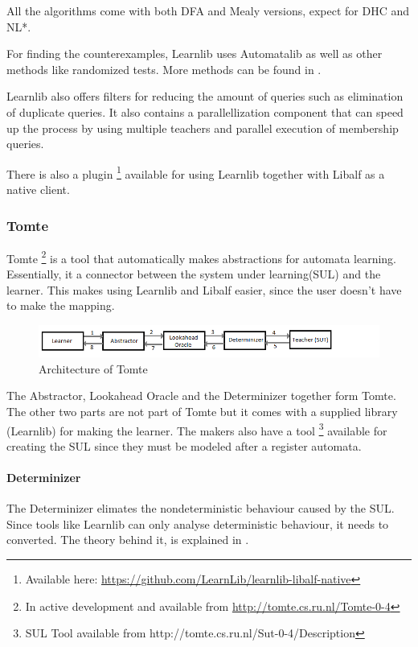 \documentclass[multi,crop=false,class=article]{standalone}
\begin{document}
All the algorithms come with both DFA and Mealy versions, expect for DHC and NL*.

For finding the counterexamples, Learnlib uses Automatalib as well as other 
methods like randomized tests. More methods can be found in \cite{Isberner2015}.

Learnlib also offers filters for reducing the amount of queries such as 
elimination of duplicate queries. %
It also contains a parallellization component that can speed up the process by 
using multiple teachers and parallel execution of membership 
queries\cite{Henrix15}\cite{Howar2012}. 

There is also a plugin \footnote{Available here: 
\url{https://github.com/LearnLib/learnlib-libalf-native}} available for using 
Learnlib together with Libalf as a 
native client.

\subsubsection{Tomte}
\label{sssec:tomte}
Tomte \footnote{In active development and available from 
\url{http://tomte.cs.ru.nl/Tomte-0-4}} is a tool that automatically makes 
abstractions for automata learning. Essentially, it a connector between the 
system under learning(SUL) and the learner. This makes using Learnlib and 
Libalf easier, since the user doesn't have to make the mapping.

\begin{figure}[!ht]
	\includegraphics[width=\textwidth]{Tool_images/tomte_network.png}
	\caption{Architecture of Tomte}
	\label{fig:tomte_arch_interactoin}
\end{figure}

The Abstractor, Lookahead Oracle and the Determinizer together form Tomte. The 
other two parts are not part of Tomte but it comes with a supplied library 
(Learnlib) for making the learner.
The makers also have a tool \footnote{SUL Tool available from 
http://tomte.cs.ru.nl/Sut-0-4/Description} available for creating the SUL since 
they must be modeled after a register automata.
 
\paragraph{Determinizer}
The Determinizer elimates the nondeterministic behaviour caused by the SUL. 
Since tools like Learnlib can only analyse deterministic behaviour, it needs to 
converted. The theory behind it, is explained in \cite{Aarts2015}.
\end{document}
